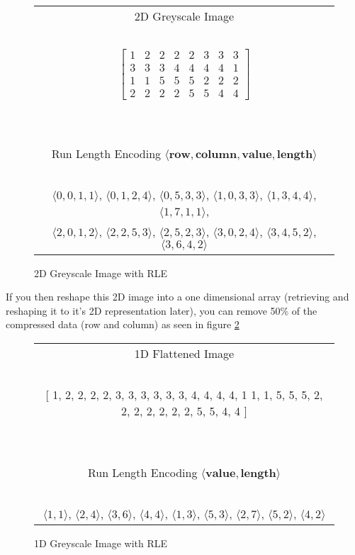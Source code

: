 \begin{figure}
  \centering

  \begin{tabular}{c}

  2D Greyscale Image \\
  \ \\
    $
  \begin{bmatrix}
    1 & 2 & 2 & 2 & 2 & 3 & 3 & 3 \\
    3 & 3 & 3 & 4 & 4 & 4 & 4 & 1 \\
    1 & 1 & 5 & 5 & 5 & 2 & 2 & 2 \\
    2 & 2 & 2 & 2 & 5 & 5 & 4 & 4
  \end{bmatrix}
  $ \\
  \ \\
  \hline
  \ \\
  Run Length Encoding $\langle \textbf{row}, \textbf{column}, \textbf{value}, \textbf{length} \rangle$\\
  \ \\
  $\langle 0, 0, 1, 1 \rangle$,
  $\langle 0, 1, 2, 4 \rangle$,
  $\langle 0, 5, 3, 3 \rangle$,
  $\langle 1, 0, 3, 3 \rangle$,
  $\langle 1, 3, 4, 4 \rangle$,
  $\langle 1, 7, 1, 1 \rangle$, \\
  $\langle 2, 0, 1, 2 \rangle$,
  $\langle 2, 2, 5, 3 \rangle$,
  $\langle 2, 5, 2, 3 \rangle$,
  $\langle 3, 0, 2, 4 \rangle$,
  $\langle 3, 4, 5, 2 \rangle$,
  $\langle 3, 6, 4, 2 \rangle$
  \\
  \end{tabular}
  \caption{2D Greyscale Image with RLE}
  \label{fig:rle-2d}
\end{figure}

If you then reshape this 2D image into a one dimensional array (retrieving and reshaping it to it's 2D representation later), you can remove 50\% of the compressed data (row and column) as seen in figure \ref{fig:rle-1d}

\begin{figure}
  \centering

  \begin{tabular}{c}

  1D Flattened Image \\
  \ \\
  {[}
    1, 2, 2, 2, 2, 3, 3, 3, 3, 3, 3, 4, 4, 4, 4, 1
    1, 1, 5, 5, 5, 2, 2, 2, 2, 2, 2, 2, 5, 5, 4, 4
  {]} \\
  \ \\
  \hline
  \ \\
  Run Length Encoding $\langle \textbf{value}, \textbf{length} \rangle$\\
  \ \\
  $\langle 1, 1 \rangle$,
  $\langle 2, 4 \rangle$,
  $\langle 3, 6 \rangle$,
  $\langle 4, 4 \rangle$,
  $\langle 1, 3 \rangle$,
  $\langle 5, 3 \rangle$,
  $\langle 2, 7 \rangle$,
  $\langle 5, 2 \rangle$,
  $\langle 4, 2 \rangle$
  \end{tabular}
  \caption{1D Greyscale Image with RLE}
  \label{fig:rle-1d}
\end{figure}

